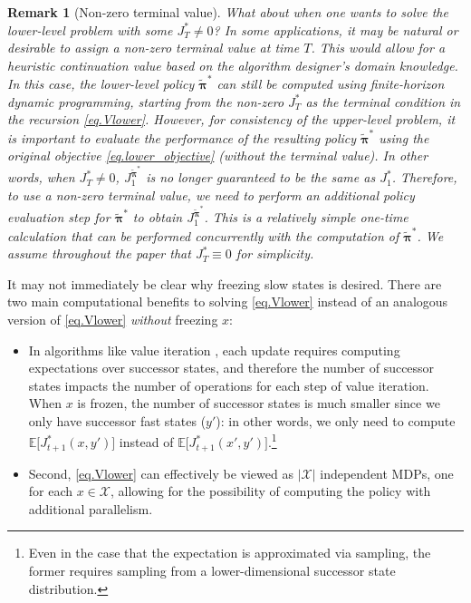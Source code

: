 \documentclass[11pt, notitlepage]{article}
\newcommand{\E}{\mathbb{E}}
\newcommand{\1}{\mathbbm{1}}
\newtheorem{remark}{Remark}
\begin{document}
\begin{remark}[Non-zero terminal value] 
What about when one wants to solve the lower-level problem with some $J_T^* \neq 0$? In some applications, it may be natural or desirable to assign a non-zero terminal value at time $T$. This would allow for a heuristic continuation value based on the algorithm designer's domain knowledge. In this case, the lower-level policy $\tilde{\boldsymbol{\pi}}^*$ can still be computed using finite-horizon dynamic programming, starting from the non-zero $J_T^*$ as the terminal condition in the recursion \eqref{eq.Vlower}. However, for consistency of the upper-level problem, it is important to evaluate the performance of the resulting policy $\tilde{\boldsymbol{\pi}}^*$ using the original objective \eqref{eq.lower_objective} (without the terminal value). In other words, when $J_T^* \neq 0$, $J_1^{\tilde{\boldsymbol{\pi}}^*}$ is no longer guaranteed to be the same as $J_1^*$. Therefore, to use a non-zero terminal value, we need to perform an additional policy evaluation step for $\tilde{\boldsymbol{\pi}}^*$ to obtain $J_1^{\tilde{\boldsymbol{\pi}}^*}$. This is a relatively simple one-time calculation that can be performed concurrently with the computation of $\tilde{\boldsymbol{\pi}}^*$. We assume throughout the paper that $J_T^* \equiv 0$ for simplicity.
\end{remark}


It may not immediately be clear why freezing slow states is desired. There are two main computational benefits to solving \eqref{eq.Vlower} instead of an analogous version of \eqref{eq.Vlower} \emph{without} freezing $x$:
\begin{itemize}
    \item In algorithms like value iteration \citep{puterman2014markov}, each update requires computing expectations over successor states, and therefore the number of successor states impacts the number of operations for each step of value iteration. When $x$ is frozen, the number of successor states is much smaller since we only have successor fast states ($y'$): in other words, we only need to compute $\E \bigl[J_{t+1}^*(x,y')\bigr]$ instead of $\E \bigl[J_{t+1}^*(x',y')\bigr]$.\footnote{Even in the case that the expectation is approximated via sampling, the former requires sampling from a lower-dimensional successor state distribution.}
        
    \item  Second, \eqref{eq.Vlower} can effectively be viewed as $|\mathcal X|$ independent MDPs, one for each $x\in\mathcal X$, allowing for the possibility of computing the policy with additional parallelism. 
\end{itemize}
\end{document}
